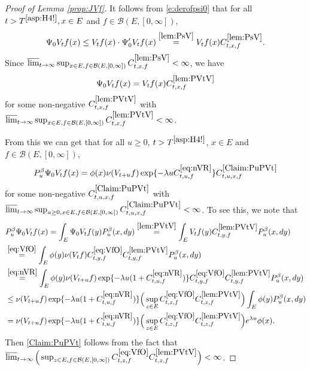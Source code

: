 \documentclass[12pt,a4paper]{amsart}
\numberwithin{equation}{section}
\theoremstyle{plain}
\theoremstyle{definition}
\theoremstyle{remark}
\begin{document}
\begin{proof}[Proof of Lemma \ref{prop:JVf}]
	It follows from \eqref{e:derofpsi0} that for all $t> T^{\eqref{asp:H4!}}, x\in E$ and $f\in \mathcal B(E,[0,\infty])$,
\begin{equation}
	\Psi_0 V_t f (x)
	\leq V_tf(x)\cdot \Psi_0' V_t f(x) \overset{\eqref{lem:PsV}}= V_tf(x) C^{\eqref{lem:PsV}}_{t,x,f}.
\end{equation}
	Since $\varlimsup_{t\to \infty} \sup_{x\in E, f\in \mathcal B(E,[0,\infty])} C^{\eqref{lem:PsV}}_{t,x,f} <\infty$, we have
\begin{equation} \label{lem:PVtV}
	\Psi_0 V_t f(x) = V_tf(x) C^{\eqref{lem:PVtV}}_{t,x,f}
\end{equation}
	for some non-negative $C^{\eqref{lem:PVtV}}_{t,x,f}$ with $\varlimsup_{t\to \infty} \sup_{x\in E, f\in \mathcal B(E,[0,\infty])}
	C^{\eqref{lem:PVtV}}_{t,x,f} < \infty$.
	
	From this we can get that for all $u\geq 0$, $t>T^{\eqref{asp:H4!}}$, $x\in E$ and $f\in \mathcal B(E,[0,\infty])$,
\begin{equation} \label{Claim:PuPVt}
	P_u^\beta \Psi_0 V_{t} f(x) = \phi(x)\nu(V_{t+u}f) \exp\{-\lambda u C^{\eqref{eq:nVR}}_{t,u,f} \} C^{\eqref{Claim:PuPVt}}_{t,u,x,f}
\end{equation}
	for some non-negative $C^{\eqref{Claim:PuPVt}}_{t,u,x,f}$ with 
	$\varlimsup_{t\to \infty} 
	\sup_{u\geq 0, x\in E, f\in \mathcal B(E,[0,\infty])} 
	C^{\eqref{Claim:PuPVt}}_{t,u,x,f} < \infty$.
	To see this, we note that
	\begin{align}
	&P_u^\beta \Psi_0 V_{t} f(x)
	= \int_{E} \Psi_0V_tf(y) P_u^\beta (x,dy)
	\overset{\eqref{lem:PVtV}}=\int_{E} V_tf(y)C^{\eqref{lem:PVtV}}_{t,y,f} P_u^\beta (x,dy)
	\\&\overset{\eqref{eq:VfO}}=\int_{E} \phi(y)\nu(V_tf)C^{\eqref{eq:VfO}}_{t,y,f}C^{\eqref{lem:PVtV}}_{t,y,f} P_u^\beta (x,dy)
	\\&\overset{\eqref{eq:nVR}}=\int_{E} \phi(y)\nu(V_{t+u}f) \exp\{-\lambda u (1+C^{\eqref{eq:nVR}}_{t,u,f}) \} C^{\eqref{eq:VfO}}_{t,y,f}C^{\eqref{lem:PVtV}}_{t,y,f} P_u^\beta (x,dy)
	\\& \leq \nu(V_{t+u}f) \exp\{-\lambda u (1+C^{\eqref{eq:nVR}}_{t,u,f}) \} \Big(\sup_{z\in E} C^{\eqref{eq:VfO}}_{t,z,f}C^{\eqref{lem:PVtV}}_{t,z,f}\Big) \int_{E} \phi(y) P_u^\beta (x,dy)
	\\& = \nu(V_{t+u}f) \exp\{-\lambda u (1+C^{\eqref{eq:nVR}}_{t,u,f}) \} \Big(\sup_{z\in E} C^{\eqref{eq:VfO}}_{t,z,f}C^{\eqref{lem:PVtV}}_{t,z,f}\Big) e^{\lambda u}\phi(x).
	\end{align}
	Then \eqref{Claim:PuPVt} follows from the fact that 
	$\varlimsup_{t\to \infty} \Big(
	\sup_{z\in E, f\in \mathcal B(E,[0,\infty])} C^{\eqref{eq:VfO}}_{t,z,f}
	C^{\eqref{lem:PVtV}}_{t,z,f}\Big) < \infty$.
	

\end{proof}
\end{document}

